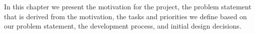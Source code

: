 

In this chapter we present the motivation for the project, the problem statement that is derived from the motivation, the tasks and priorities we define based on our problem statement, the development process, and initial design decisions.